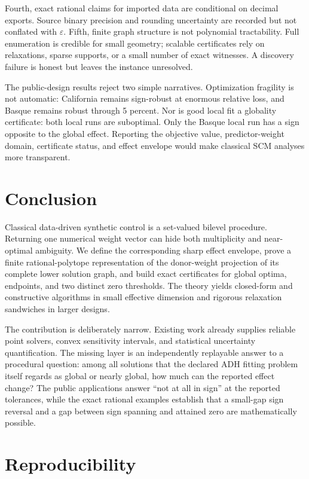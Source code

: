 \documentclass[10pt]{article}
\theoremstyle{definition}
\newcommand{\eps}{\varepsilon}
\begin{document}
Fourth, exact rational claims for imported data are conditional on decimal
exports.  Source binary precision and rounding uncertainty are recorded but
not conflated with $\eps$.  Fifth, finite graph structure is not polynomial
tractability.  Full enumeration is credible for small geometry; scalable
certificates rely on relaxations, sparse supports, or a small number of exact
witnesses.  A discovery failure is honest but leaves the instance unresolved.

The public-design results reject two simple narratives.  Optimization fragility
is not automatic: California remains sign-robust at enormous relative loss,
and Basque remains robust through 5 percent.  Nor is good local fit a globality
certificate: both local runs are suboptimal. Only the Basque local run has a
sign opposite to the global effect.
Reporting the objective value, predictor-weight domain, certificate status, and
effect envelope would make classical SCM analyses more transparent.

\section{Conclusion}

Classical data-driven synthetic control is a set-valued bilevel procedure.
Returning one numerical weight vector can hide both multiplicity and
near-optimal ambiguity.  We define the corresponding sharp effect envelope,
prove a finite rational-polytope representation of the donor-weight projection
of its complete lower solution graph,
and build exact certificates for global optima, endpoints, and two distinct
zero thresholds.  The theory yields closed-form and constructive algorithms in
small effective dimension and rigorous relaxation sandwiches in larger
designs.

The contribution is deliberately narrow.  Existing work already supplies
reliable point solvers, convex sensitivity intervals, and statistical
uncertainty quantification.  The missing layer is an independently replayable
answer to a procedural question: among all solutions that the declared ADH
fitting problem itself regards as global or nearly global, how much can the
reported effect change?  The public applications answer ``not at all in sign''
at the reported tolerances, while the exact rational examples establish that a
small-gap sign reversal and a gap between sign spanning and attained zero are
mathematically possible.

\section{Reproducibility}\label{sec:repro}
\end{document}
